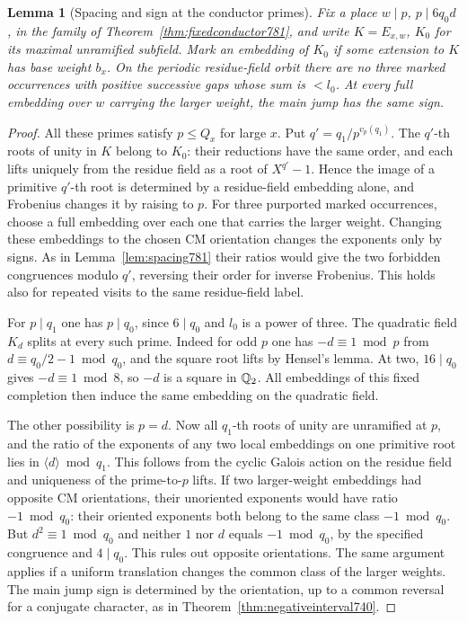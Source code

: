\documentclass[a4paper,11pt]{article}
\newtheorem{lemma}[proposition]{Lemma}
\theoremstyle{definition}
\theoremstyle{remark}
\numberwithin{equation}{section}
\begin{document}
\begin{lemma}[Spacing and sign at the conductor primes]
\leavevmode\label{lem:conductorsign783}
Fix a place \(w\mid p\), \(p\mid6q_0d\), in the family
of Theorem~\ref{thm:fixedconductor781}, and write
\(K=E_{x,w}\), \(K_0\) for its maximal unramified subfield.
Mark an embedding of \(K_0\) if some extension to \(K\)
has base weight \(b_x\). On the periodic residue-field
orbit there are no three marked occurrences with positive
successive gaps whose sum is \(<l_0\). At every full
embedding over \(w\) carrying the larger weight, the
main jump has the same sign.
\end{lemma}
\begin{proof}
All these primes satisfy \(p\le Q_x\) for large \(x\).
Put \(q'=q_1/p^{v_p(q_1)}\). The \(q'\)-th roots of unity
in \(K\) belong to \(K_0\): their reductions have the
same order, and each lifts uniquely from the residue field
as a root of \(X^{q'}-1\). Hence the image of a primitive
\(q'\)-th root is determined by a residue-field embedding
alone, and Frobenius changes it by raising to \(p\).
For three purported marked occurrences, choose a full
embedding over each one that carries the larger weight.
Changing these embeddings to the chosen CM orientation
changes the exponents only by signs. As in
Lemma~\ref{lem:spacing781} their ratios would give the
two forbidden congruences modulo \(q'\), reversing their
order for inverse Frobenius. This holds also for repeated
visits to the same residue-field label.

For \(p\mid q_1\) one has \(p\mid q_0\), since \(6\mid q_0\)
and \(l_0\) is a power of three. The quadratic field
\(K_d\) splits at every such prime. Indeed for odd \(p\)
one has \(-d\equiv1\bmod p\) from
\(d\equiv q_0/2-1\bmod q_0\), and the square root lifts
by Hensel's lemma. At two, \(16\mid q_0\) gives
\(-d\equiv1\bmod8\), so \(-d\) is a square in \(\mathbb Q_2\).
All embeddings of this fixed completion then induce
the same embedding on the quadratic field.

The other possibility is \(p=d\). Now all \(q_1\)-th
roots of unity are unramified at \(p\), and the ratio
of the exponents of any two local embeddings on one
primitive root lies in \(\langle d\rangle\bmod q_1\).
This follows from the cyclic Galois action on the residue
field and uniqueness of the prime-to-\(p\) lifts. If
two larger-weight embeddings had opposite CM orientations,
their unoriented exponents would have ratio \(-1\bmod q_0\):
their oriented exponents both belong to the same class
\(-1\bmod q_0\). But \(d^2\equiv1\bmod q_0\) and neither
\(1\) nor \(d\) equals \(-1\bmod q_0\), by the specified
congruence and \(4\mid q_0\). This rules out opposite
orientations. The same argument applies if a uniform
translation changes the common class of the larger
weights. The main jump sign is determined by the
orientation, up to a common reversal for a conjugate
character, as in Theorem~\ref{thm:negativeinterval740}.
\end{proof}
\end{document}
